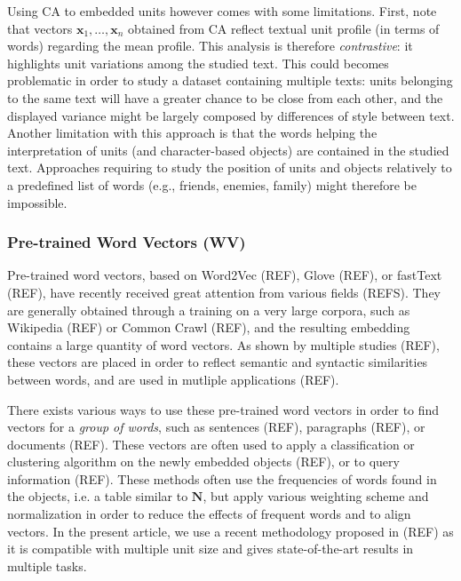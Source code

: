 \documentclass[
twocolumn,
]{ceurart}
\begin{document}
Using CA to embedded units however comes with some limitations. First, note that vectors $\mathbf{x}_1, \ldots, \mathbf{x}_n$ obtained from CA reflect textual unit profile (in terms of words) regarding the mean profile. This analysis is therefore \emph{contrastive}: it highlights unit variations among the studied text. This could becomes problematic in order to study a dataset containing multiple texts: units belonging to the same text will have a greater chance to be close from each other, and the displayed variance might be largely composed by differences of style between text. Another limitation with this approach is that the words helping the interpretation of units (and character-based objects) are contained in the studied text. Approaches requiring to study the position of units and objects relatively to a predefined list of words (e.g., friends, enemies, family) might therefore be impossible.

\subsubsection{Pre-trained Word Vectors (WV)}
\label{wv_method}

Pre-trained word vectors, based on Word2Vec (REF), Glove (REF), or fastText (REF), have recently received great attention from various fields (REFS). They are generally obtained through a training on a very large corpora, such as Wikipedia (REF) or Common Crawl (REF), and the resulting embedding contains a large quantity of word vectors. As shown by multiple studies (REF), these vectors are placed in order to reflect semantic and syntactic similarities between words, and are used in mutliple applications (REF). 

There exists various ways to use these pre-trained word vectors in order to find vectors for a \emph{group of words}, such as sentences (REF), paragraphs (REF), or documents (REF). These vectors are often used to apply a classification or clustering algorithm on the newly embedded objects (REF), or to query information (REF). These methods often use the frequencies of words found in the objects, i.e. a table similar to $\mathbf{N}$, but apply various weighting scheme and normalization in order to reduce the effects of frequent words and to align vectors. In the present article, we use a recent methodology proposed in (REF) as it is compatible with multiple unit size and gives state-of-the-art results in multiple tasks. 
\end{document}
